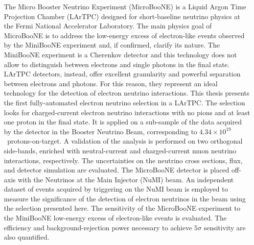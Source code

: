 The Micro Booster Neutrino Experiment (MicroBooNE) is a Liquid Argon Time Projection Chamber (LArTPC) designed for short-baseline neutrino physics at the Fermi National Accelerator Laboratory. The main physics goal of MicroBooNE is to address the low-energy excess of electron-like events observed by the MiniBooNE experiment and, if confirmed, clarify its nature.
The MiniBooNE experiment is a Cherenkov detector and this technology does not allow to distinguish between electrons and single photons in the final state. 
LArTPC detectors, instead, offer excellent granularity and powerful separation between electrons and photons. For this reason, they represent an ideal technology for the detection of electron neutrino interactions.
This thesis presents the first fully-automated electron neutrino selection in a LArTPC. The selection looks for charged-current electron neutrino interactions with no pions and at least one proton in the final state. It is applied on a sub-sample of the data acquired by the detector in the Booster Neutrino Beam, corresponding to $4.34\times10^{19}$~protons-on-target. A validation of the analysis is performed on two orthogonal side-bands, enriched with neutral-current and charged-current muon neutrino interactions, respectively. The uncertainties on the neutrino cross sections, flux, and detector simulation are evaluated.
The MicroBooNE detector is placed off-axis with the Neutrinos at the Main Injector (NuMI) beam. An independent dataset of events acquired by triggering on the NuMI beam is employed to measure the significance of the detection of electron neutrinos in the beam using the selection presented here. 
The sensitivity of the MicroBooNE experiment to the MiniBooNE low-energy excess of electron-like events is evaluated. The efficiency and background-rejection power necessary to achieve $5\sigma$ sensitivity are also quantified.